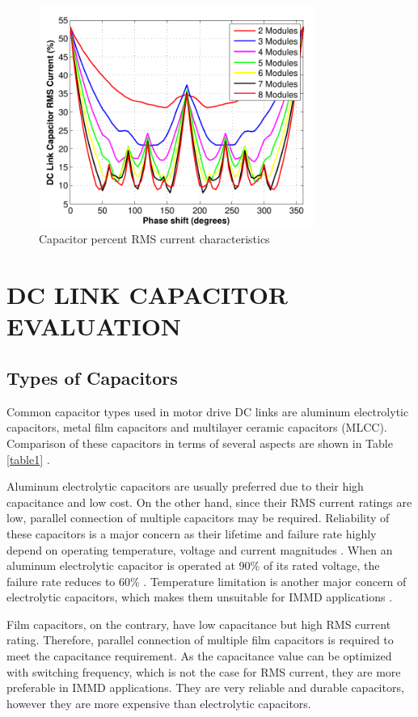 \documentclass[conference,a4paper,twocolumn]{IEEEtran}
\begin{document}
\begin{figure}[h]
  \centering
  \includegraphics[width=9cm]{fig5_2}
  \caption{Capacitor percent RMS current characteristics}
  \label{fig5}
\end{figure}



\section{DC LINK CAPACITOR EVALUATION}

\subsection{Types of Capacitors}


Common capacitor types used in motor drive DC links are aluminum electrolytic capacitors, metal film capacitors and multilayer ceramic capacitors (MLCC). Comparison of these capacitors in terms of several aspects are shown in Table \ref{table1} \cite{LoCalzo2016,Lambert2015a,Wang2013,Wang2015b,Brown2007}.

Aluminum electrolytic capacitors are usually preferred due to their high capacitance and low cost. On the other hand, since their RMS current ratings are low, parallel connection of multiple capacitors may be required. Reliability of these capacitors is a major concern as their lifetime and failure rate highly depend on operating temperature, voltage and current magnitudes \cite{Su2010}. When an aluminum electrolytic capacitor is operated at 90\% of its rated voltage, the failure rate reduces to 60\% \cite{Bianchi2003}. Temperature limitation is another major concern of electrolytic capacitors, which makes them unsuitable for IMMD applications \cite{Brown2007}.

Film capacitors, on the contrary, have low capacitance but high RMS current rating. Therefore, parallel connection of multiple film capacitors is required to meet the capacitance requirement. As the capacitance value can be optimized with switching frequency, which is not the case for RMS current, they are more preferable in IMMD applications. They are very reliable and durable capacitors, however they are more expensive than electrolytic capacitors.
\end{document}
